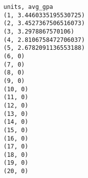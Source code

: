 \begin{verbatim}
units, avg_gpa
(1, 3.4460335195530725)
(2, 3.4527367506516073)
(3, 3.2978867570106)
(4, 2.8106758472706037)
(5, 2.6782091136553188)
(6, 0)
(7, 0)
(8, 0)
(9, 0)
(10, 0)
(11, 0)
(12, 0)
(13, 0)
(14, 0)
(15, 0)
(16, 0)
(17, 0)
(18, 0)
(19, 0)
(20, 0)
\end{verbatim}